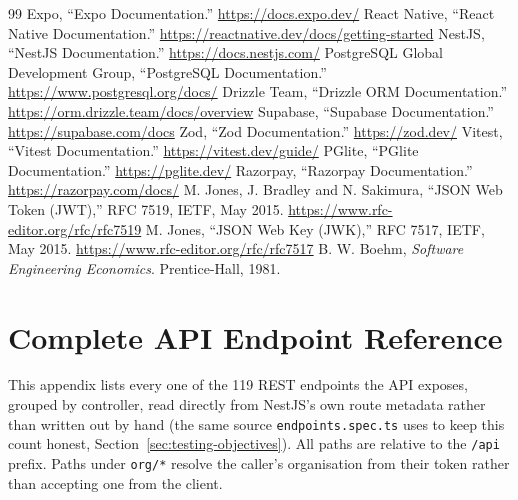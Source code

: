 \clearpage{}
\begin{thebibliography}{99}
 Expo, ``Expo Documentation.'' \url{https://docs.expo.dev/}
 React Native, ``React Native Documentation.'' \url{https://reactnative.dev/docs/getting-started}
 NestJS, ``NestJS Documentation.'' \url{https://docs.nestjs.com/}
 PostgreSQL Global Development Group, ``PostgreSQL Documentation.'' \url{https://www.postgresql.org/docs/}
 Drizzle Team, ``Drizzle ORM Documentation.'' \url{https://orm.drizzle.team/docs/overview}
 Supabase, ``Supabase Documentation.'' \url{https://supabase.com/docs}
 Zod, ``Zod Documentation.'' \url{https://zod.dev/}
 Vitest, ``Vitest Documentation.'' \url{https://vitest.dev/guide/}
 PGlite, ``PGlite Documentation.'' \url{https://pglite.dev/}
 Razorpay, ``Razorpay Documentation.'' \url{https://razorpay.com/docs/}
 M. Jones, J. Bradley and N. Sakimura, ``JSON Web Token (JWT),'' RFC 7519, IETF, May 2015. \url{https://www.rfc-editor.org/rfc/rfc7519}
 M. Jones, ``JSON Web Key (JWK),'' RFC 7517, IETF, May 2015. \url{https://www.rfc-editor.org/rfc/rfc7517}
 B. W. Boehm, \emph{Software Engineering Economics}. Prentice-Hall, 1981.
\end{thebibliography}

\appendix
\renewcommand{\thechapter}{\Alph{chapter}}

\chapter{Complete API Endpoint Reference}
\label{app:endpoints}
This appendix lists every one of the 119 REST endpoints the API exposes, grouped by controller, read directly from NestJS's own route metadata rather than written out by hand (the same source \texttt{endpoints.spec.ts} uses to keep this count honest, Section~\ref{sec:testing-objectives}). All paths are relative to the \texttt{/api} prefix. Paths under \texttt{org/*} resolve the caller's organisation from their token rather than accepting one from the client.

